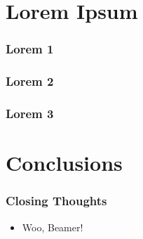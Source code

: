 \documentclass{beamer}
\begin{document}
	\section{Lorem Ipsum}
		\begin{frame}
			\frametitle{Lorem 1}
			\blindtext
		\end{frame}

		\begin{frame}
			\frametitle{Lorem 2}
			\blindtext
		\end{frame}

		\begin{frame}
			\frametitle{Lorem 3}
			\blindtext
		\end{frame}

	\section{Conclusions}
		\begin{frame}
			\frametitle{Closing Thoughts}
			\begin{itemize}
				\item Woo, Beamer!
			\end{itemize}
		\end{frame}
\end{document}

